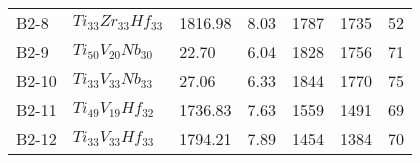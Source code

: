 \begin{tabular}{lllllll}
         B2-8 &                                $Ti_{33}Zr_{33}Hf_{33}$ &              1816.98 &                           8.03 &                              1787 &                             1735 &                                        52 \\
         B2-9 &                                 $Ti_{50}V_{20}Nb_{30}$ &                22.70 &                           6.04 &                              1828 &                             1756 &                                        71 \\
        B2-10 &                                 $Ti_{33}V_{33}Nb_{33}$ &                27.06 &                           6.33 &                              1844 &                             1770 &                                        75 \\
        B2-11 &                                 $Ti_{49}V_{19}Hf_{32}$ &              1736.83 &                           7.63 &                              1559 &                             1491 &                                        69 \\
        B2-12 &                                 $Ti_{33}V_{33}Hf_{33}$ &              1794.21 &                           7.89 &                              1454 &                             1384 &                                        70 \\
\bottomrule
\end{tabular}
